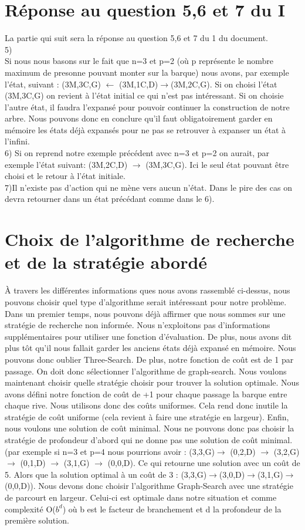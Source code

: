 \documentclass[a4paper, 12pt, french,oneside]{book}
\begin{document}
\section{Réponse au question 5,6 et 7 du I}
La partie qui suit sera la réponse au question 5,6 et 7 du 1 du document. \\
5) \\
Si nous nous  basons sur le fait que n=3 et p=2 (où p représente le nombre maximum de presonne pouvant monter sur la barque) nous avons, par exemple l'état, suivant :
(3M,3C,G) $\leftarrow$ (3M,1C,D)$\rightarrow$(3M,2C,G). Si on choisi l'état (3M,3C,G) on revient à l'état initial ce qui n'est pas intéressant. Si on choisie l'autre état, il faudra l'expansé pour pouvoir continuer la construction de notre arbre. Nous pouvons donc en conclure qu'il faut obligatoirement garder en mémoire les états déjà expansés pour ne pas se retrouver à expanser un état à l'infini.\\
6) Si on reprend notre exemple précédent avec n=3 et p=2 on aurait, par exemple l'état suivant: (3M,2C,D) $\rightarrow$ (3M,3C,G). Ici le seul état pouvant être choisi et le retour à l'état initiale.\\
7)Il n'existe pas d'action qui ne mène vers aucun n'état. Dans le pire des cas on devra retourner dans un état précédant comme dans le 6). \\
\section{Choix de l'algorithme de recherche et de la stratégie abordé}
À travers les différentes informations ques nous avons rassemblé ci-dessus, nous pouvons choisir quel type d'algorithme serait intéressant pour notre problème. Dans un premier temps, nous pouvons déjà affirmer que nous sommes sur une stratégie de recherche non informée. Nous n'exploitons pas d'informations supplémentaires pour utiliser une fonction d'évaluation. De plus, nous avons dit plus tôt qu'il nous fallait garder les anciens états déjà expansé en mémoire. Nous pouvons donc oublier Three-Search. De plus, notre fonction de coût est de 1 par passage. On doit donc sélectionner l'algorithme de graph-search. Nous voulons maintenant choisir quelle stratégie choisir pour trouver la solution optimale. Nous avons défini notre fonction de coût de +1 pour chaque passage la barque entre chaque rive. Nous utilisons donc des coûts uniformes. Cela rend donc inutile la stratégie de coût uniforme (cela revient à faire une stratégie en largeur). Enfin, nous voulons une solution de coût minimal. Nous ne pouvons donc pas choisir la stratégie de profondeur d'abord qui ne donne pas une solution de coût minimal.(par exemple si n=3 et p=4 nous pourrions avoir : (3,3,G)$\rightarrow$ (0,2,D) $\rightarrow$ (3,2,G) $\rightarrow$ (0,1,D) $\rightarrow$ (3,1,G) $\rightarrow$ (0,0,D). Ce qui retourne une solution avec un coût de 5. Alors que la solution optimal à un coût de 3 : (3,3,G)$\rightarrow$(3,0,D)$\rightarrow$(3,1,G)$\rightarrow$(0,0,D)). Nous devons donc choisir l'algorithme Graph-Search avec une stratégie de parcourt en largeur. Celui-ci est optimale dans notre situation et comme complexité O($b^d$) où b est le facteur de branchement et d la profondeur de la première solution.
\end{document}
